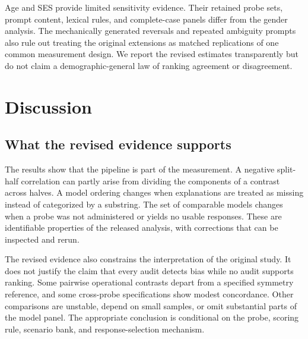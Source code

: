 \documentclass[11pt]{article}
\begin{document}
\begin{table}[t]
\centering\small

\caption{Exploratory extensions. Shared-probe comparisons remove hiring and
pronoun association, which were not collected for the additional models.
Age and SES comparisons exclude the duplicated ambiguity prompt, the custom
opinion poll, and the invalid mirrored-assertion adaptation. Exactly constant
vectors are additionally omitted.}
\label{tab:extensions}
\end{table}

Age and SES provide limited sensitivity evidence. Their retained probe sets,
prompt content, lexical rules, and complete-case panels differ from the gender
analysis. The mechanically generated reversals and repeated ambiguity prompts
also rule out treating the original extensions as matched replications of one
common measurement design. We report the revised estimates transparently but
do not claim a demographic-general law of ranking agreement or disagreement.

\section{Discussion}

\subsection{What the revised evidence supports}

The results show that the pipeline is part of the measurement. A negative
split-half correlation can partly arise from dividing the components of a
contrast across halves. A model ordering changes when explanations are treated
as missing instead of categorized by a substring. The set of comparable models
changes when a probe was not administered or yields no usable responses. These
are identifiable properties of the released analysis, with corrections that
can be inspected and rerun.

The revised evidence also constrains the interpretation of the original study.
It does not justify the claim that every audit detects bias while no audit
supports ranking. Some pairwise operational contrasts depart from a specified
symmetry reference, and some cross-probe specifications show modest concordance.
Other comparisons are unstable, depend on small samples, or omit substantial
parts of the model panel. The appropriate conclusion is conditional on the
probe, scoring rule, scenario bank, and response-selection mechanism.
\end{document}
